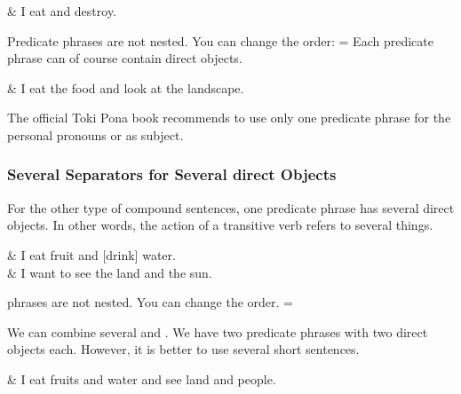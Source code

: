 \begin{translationtable}
     & I eat and destroy. \\
\end{translationtable}
%
Predicate phrases are not nested. You can change the order:
 = 
Each predicate phrase can of course contain direct objects.

\begin{translationtable}
     & I eat the food and look at the landscape. \\
\end{translationtable}
%
The official Toki Pona book recommends to use only one predicate phrase for the personal pronouns  or  as subject.

\subsubsection*{Several  Separators for Several direct Objects}
\label{sssec:multiple_e}
For the other type of compound sentences, one predicate phrase has several direct objects.
In other words, the action of a transitive verb refers to several things.

\begin{translationtable}
         & I eat fruit and [drink] water.      \\
     & I want to see the land and the sun. \\
\end{translationtable}
%
 phrases are not nested. You can change the order.
 = 

We can combine several  and .
We have two predicate phrases with two direct objects each.
However, it is better to use several short sentences.

\begin{translationtable}
     & I eat fruits and water and see land and people. \\
\end{translationtable}

